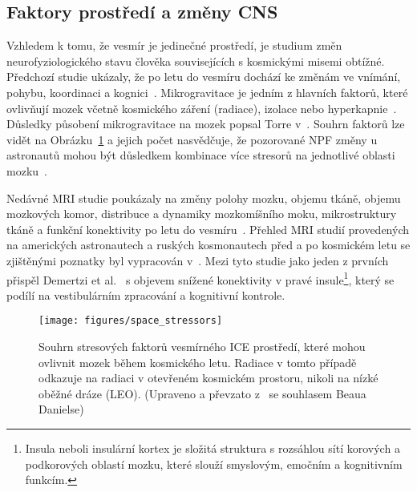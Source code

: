 \subsection{Faktory prostředí a změny CNS}
\label{subsection:faktory_prostredi_zmeny_cns}
Vzhledem k tomu, že vesmír je jedinečné prostředí, je studium změn
neurofyziologického stavu člověka souvisejících s kosmickými misemi obtížné.
Předchozí studie ukázaly, že po letu do vesmíru dochází ke změnám ve vnímání,
pohybu, koordinaci a kognici~\cite{Moore2019}. Mikrogravitace je jedním z
hlavních faktorů, které ovlivňují mozek včetně kosmického záření (radiace),
izolace nebo hyperkapnie~\cite{Roy2021}. Důsledky působení mikrogravitace na
mozek popsal Torre v~\cite{Torre2014}. Souhrn faktorů lze vidět na
Obrázku~\ref{fig:factors_neuro} a jejich počet nasvědčuje, že pozorované
\gls{NPF} změny u astronautů mohou být důsledkem kombinace více stresorů na
jednotlivé oblasti mozku~\cite{Roy2021}.

Nedávné MRI studie poukázaly na změny polohy mozku, objemu tkáně, objemu
mozkových komor, distribuce a dynamiky mozkomíšního moku, mikrostruktury tkáně a
funkční konektivity po letu do
vesmíru~\cite{Ombergen2019,Pechenkova2019,Roberts2017,Demertzi2015,Kramer2020}.
Přehled \gls{MRI} studií provedených na amerických astronautech a ruských
kosmonautech před a po kosmickém letu se zjištěnými poznatky byl vypracován
v~\cite{Roy2021}. Mezi tyto studie jako jeden z prvních přispěl Demertzi et
al.~\cite{Demertzi2015} s objevem snížené konektivity v pravé
insule\footnote{Insula neboli insulární kortex je složitá struktura s rozsáhlou
sítí korových a podkorových oblastí mozku, které slouží smyslovým, emočním a
kognitivním funkcím.}, který se podílí na vestibulárním zpracování a kognitivní
kontrole.

\begin{figure}[!htb]
    \begin{center}
        \texttt{[image: figures/space\_stressors]}
        \caption{Souhrn stresových faktorů vesmírného \gls{ICE} prostředí, které
            mohou ovlivnit mozek během kosmického letu. Radiace v tomto případě
            odkazuje na radiaci v otevřeném kosmickém prostoru, nikoli na nízké
            oběžné dráze (\gls{LEO}). (Upraveno a převzato
            z~\cite{Roy2021,Hodkinson2017} se souhlasem Beaua Danielse)}
        \label{fig:factors_neuro}
    \end{center}
\end{figure}

